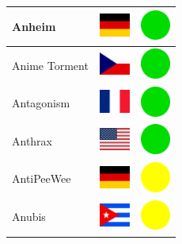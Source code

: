 \documentclass[12pt, a4paper, twoside]{report}
\begin{document}
\begin{center}
\begin{longtable}{|p{5cm}|p{2cm}|p{2cm}|}
 Anheim                                                     & \includegraphics[width=1cm]{../4x3/de} &   \includegraphics[width=1cm]{../likes/y} \\ \hline
 Anime Torment                                              & \includegraphics[width=1cm]{../4x3/cz} &   \includegraphics[width=1cm]{../likes/y} \\ \hline
 Antagonism                                                 & \includegraphics[width=1cm]{../4x3/fr} &   \includegraphics[width=1cm]{../likes/y} \\ \hline
 Anthrax                                                    & \includegraphics[width=1cm]{../4x3/us} &   \includegraphics[width=1cm]{../likes/y} \\ \hline
 AntiPeeWee                                                 & \includegraphics[width=1cm]{../4x3/de} &   \includegraphics[width=1cm]{../likes/m} \\ \hline
 Anubis                                                     & \includegraphics[width=1cm]{../4x3/cu} &   \includegraphics[width=1cm]{../likes/m} \\ \hline

\end{longtable}
\end{center}
\end{document}
